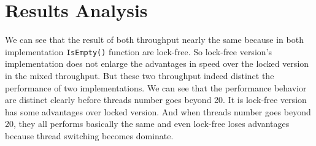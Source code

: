 \documentclass[a4paper]{report}
\begin{document}
\section*{Results Analysis}
We can see that the result of both throughput nearly the same because in both implementation \lstinline{IsEmpty()} function are lock-free. So lock-free version's implementation does not enlarge the advantages in speed over the locked version in the mixed throughput. But these two throughput indeed distinct the performance of two implementations. We can see that the performance behavior are distinct clearly before threads number goes beyond 20. It is lock-free version has some advantages over locked version. And when threads number goes beyond 20, they all performs basically the same and even lock-free loses advantages because thread switching becomes dominate.
\end{document}
